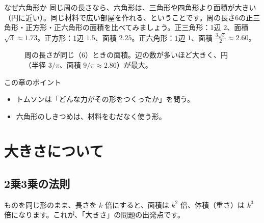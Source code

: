 \documentclass[a4paper,11pt,openany]{ltjsbook}
\begin{document}
\begin{pointbox}{なぜ六角形か}
同じ周の長さなら、六角形は、三角形や四角形より面積が大きい（円に近い）。同じ材料で広い部屋を作れる、ということです。周の長さ6の正三角形・正方形・正六角形の面積を比べてみましょう。正三角形：1辺 $2$、面積 $\sqrt3\approx1.73$。正方形：1辺 $1.5$、面積 $2.25$。正六角形：1辺 $1$、面積 $\frac{3\sqrt3}{2}\approx2.60$。
\end{pointbox}

\begin{figure}[htbp]
\centering
{}
\caption{周の長さが同じ（6）ときの面積。辺の数が多いほど大きく、円（半径 $3/\pi$、面積 $9/\pi\approx2.86$）が最大。}
\end{figure}

\begin{pointbox}{この章のポイント}
\begin{itemize}[leftmargin=1.5em]
\item トムソンは「どんな力がその形をつくったか」を問う。
\item 六角形のしきつめは、材料をむだなく使う形。
\end{itemize}
\end{pointbox}

\chapter{大きさについて}

\section{2乗3乗の法則}

ものを同じ形のまま、長さを $k$ 倍にすると、面積は $k^2$ 倍、体積（重さ）は $k^3$ 倍になります。これが、「大きさ」の問題の出発点です。
\end{document}
